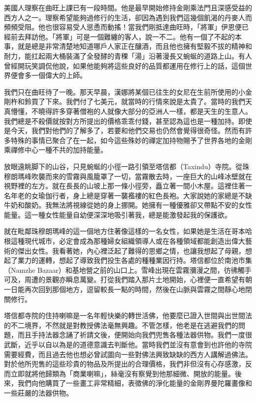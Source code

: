 美國人理察在曲旺上課已有一段時間。他是最早開始修持金剛乘法門且深感受益的西方人之一。理察希望能夠過修行的生活，卻因為遇到我們這幾個飢渴的丹麥人而頻頻受阻。他也很容易受人慫恿而動搖！當我們剛抵達曲旺時，「將軍」伊恩便已經前去拜訪他。「將軍」可是一個難纏的客人，說一不二。他有一個了不起的本事，就是總是非常清楚地知道哪戶人家正在釀酒，而且他也擁有堅毅不拔的精神和耐力，能扛起兩大桶裝滿了全發酵的青稞「湯」沿著漫長又蜿蜒的道路上山。有人曾經開玩笑調侃他說，如果他能夠將這些良好的品質都運用在修行上的話，這個世界便會多一個偉大的上師。


我們只在曲旺待了一晚。那天早晨，漢娜將某個已往生的女尼在生前所使用的小金剛杵和鈴買了下來。我們付了七美元，就當時的行情來說是太貴了。當時的我們天真懵懂，不曉得許多穿著僧袍的人就像大部分的亞洲人一樣，都是天生的生意人。我們總是不殺價就按對方所提出的價格乖乖付錢，甚至認為這也是一種加持。即使是今天，我們對他們的了解多了，若要和他們交易也仍然會覺得很奇怪。然而有許多特殊的事情已聚合了在一起，如今這些殊妙的禪定加持物賜予了世界各地的金剛乘禪修中心一種不共的加持能量。

放眼遠眺脚下的山谷，只見蜿蜒的小徑一路引領至塔信都（Taxindu）寺院。從珠穆朗瑪峰吹襲而來的雪霧與風籠罩了一切，當霧散去時，一座巨大的山峰冰壁就在視野裡的左方。就在長長的山坡上那一條小徑旁，矗立著一間小木屋。這裡住著一名年老的女瑜伽行者，身上總是穿著一襲襤褸的紅色長袍。大家說她的家總是不缺牛奶和酸奶。我無法將視線從她的身上挪開。她擁有一種優雅卻又帶點不安的女性能量。這一種女性能量自幼便深深地吸引著我，總是能激發起我的保護欲。

就在毗鄰珠穆朗瑪峰的這一個地方住著像這樣的一名女性，如果她是生活在哥本哈根這種現代城市，必定會成為那種婦女組織領導人或在各種領域都能創造出偉大藝術的傑出女性。我看著她，內心裡泛起了難得的思鄉之情，也讓我想起了母親，想起了業力的運轉，想起了導致我們投生各處的種種業因行持。塔信都位於南池市集（Namzhe
Bazaar）和基地營之前的山口上。雪峰出現在雲霧瀰漫之間，彷彿觸手可及，周遭的景觀亦瞬息萬變。打從我們踏入那片土地開始，心裡便一直希望有朝一日能再次回到那個地方，逗留較長一點的時間，然後在山脈與雲霧之間靜心地閉關修行。

塔信都寺院的住持喇嘛是一名年輕快樂的轉世活佛，他要麼已證入世間與出世間法的不二境界，不然就是對教授佛法毫無興趣。不管怎樣，他老是在逃避我們的問題，而且手持法器念誦了祈請文後，便開始向我們兜售各種法器供物。我們一度很武斷，近乎以自以為是的道德意識去判斷他。當時我們並沒有意會到也許他的寺院需要經費，而且過去他也想必曾試圖向一些對佛法興致缺缺的西方人講解過佛法。對於他所兜售的這些珍貴的物品及所提出的合理價格，我們非但沒有心存感激，反而立即就將他歸類為「商業喇嘛」，絲毫沒有察覺到他那細微、開放的能量。後來，我們向他購買了一些畫工非常精細，表徵佛的淨化能量的金剛界曼陀羅畫像和一些莊嚴的法器供物。

